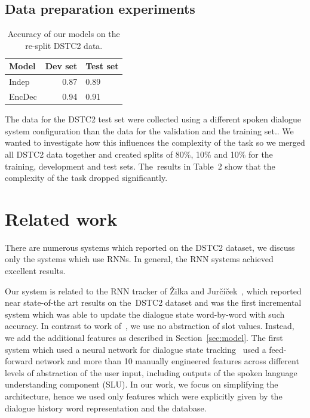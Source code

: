 \documentclass{itatnew}
\begin{document}
\subsection{Data preparation experiments}
\label{sec:split}

\begin{table}
\vspace{-0.20em}
\begin{center}
\begin{tabular}{l@{\quad}rll}
\hline
\multicolumn{1}{l}{\rule{0pt}{12pt}
                   Model}&\multicolumn{1}{l}{Dev set}&\multicolumn{2}{l}{Test set}\\[2pt]
\hline\rule{0pt}{12pt}
Indep  &   0.87 & 0.89 \\
EncDec &   0.94 & 0.91 \\
\hline
\end{tabular}
\caption{Accuracy of our models on the re-split DSTC2 data.}
\vspace{-2em}
\end{center}
\label{tabsplit}
\end{table}

The data for the DSTC2 test set were collected using a different spoken dialogue system configuration than the data for the validation and the training set.\cite{henderson2014second}.
We wanted to investigate how this influences the complexity of the task so we merged all DSTC2 data together and created splits of 80\%, 10\% and 10\% for the training, development and test sets.
The~results in Table~2 show that the complexity of the task dropped significantly.


\section{Related work}\label{sec:related}
There are numerous systems which reported on the DSTC2 dataset, we discuss only the systems which use RNNs.
In general, the RNN systems achieved excellent results.

Our system is related to the RNN tracker of Žilka and Jurčíček~\cite{zilka2015incremental},
which reported near state-of-the art results on the~DSTC2 dataset and was the first incremental system which was able to update the dialogue state word-by-word with such accuracy.
In contrast to work of~\cite{zilka2015incremental}, we use no abstraction of slot values. 
Instead, we add the additional features as described in Section~\ref{sec:model}.
The first system which used a neural network for dialogue state tracking~\cite{henderson2013deep} used a feed-forward network and more than 10 manually engineered features across different levels of abstraction of the user input, including outputs of the spoken language understanding component (SLU).
In our work, we focus on simplifying the architecture, hence we used only features which were explicitly given by the dialogue history word representation and the database.
\end{document}
